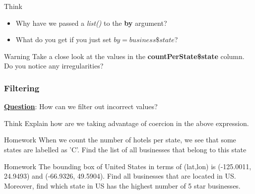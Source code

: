 \documentclass[12pt]{book}\usepackage{knitr}
\begin{document}
\begin{DIY}{Think}
\noindent \begin{itemize}
  \item Why have we passed a \emph{list()} to the \textbf{by} argument? 
  \item What do you get if you just set $by = business\$state$?
\end{itemize}
\end{DIY}

\begin{DIY}{Warning}
\noindent Take a close look at the values in the \textbf{countPerState\$state} column. Do you notice any irregularities?
\end{DIY}

\newpage
\subsubsection{Filtering}
\noindent \textbf{\underline{Question}}: How can we filter out incorrect values? 
\begin{knitrout}
\color{fgcolor}\begin{kframe}
\begin{alltt}
\hlstd{(countPerState[}\hlstd{(}
                         \hlopt{$}
                         \hlstd{),}
                   \hlstd{]}
     \hlstd{)}
\end{alltt}
\end{kframe}
\end{knitrout}

\begin{DIY}{Think}
\noindent Explain how are we taking advantage of coercion in the above expression.
\end{DIY}

\begin{DIY}{Homework}
\noindent When we count the number of hotels per state, we see that some states are labelled as 'C'. Find the list of all businesses that belong to this state
\end{DIY}

\begin{DIY}{Homework}
\noindent The bounding box of United States in terms of (lat,lon) is (-125.0011, 24.9493) and (-66.9326, 49.5904). Find all
businesses that are located in US. Moreover, find which state in US has the highest number of 5 star businesses.
\end{DIY}
\end{document}
